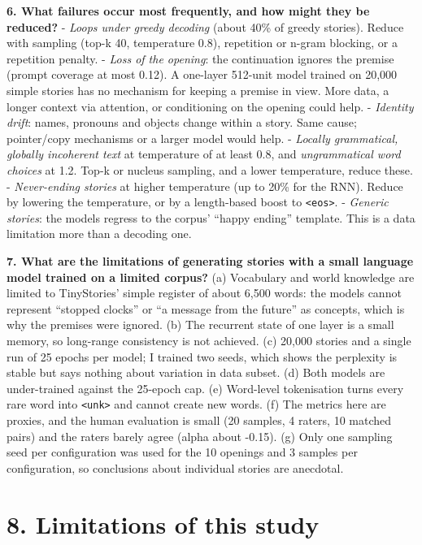 \documentclass[10pt,a4paper]{article}
\begin{document}
\textbf{6. What failures occur most frequently, and how might they be reduced?}
- \emph{Loops under greedy decoding} (about 40\% of greedy stories). Reduce with sampling (top-k 40, temperature 0.8), repetition or n-gram blocking, or a repetition penalty.
- \emph{Loss of the opening}: the continuation ignores the premise (prompt coverage at most 0.12). A one-layer 512-unit model trained on 20,000 simple stories has no mechanism
for keeping a premise in view. More data, a longer context via attention, or conditioning on the opening could help.
- \emph{Identity drift}: names, pronouns and objects change within a story. Same cause; pointer/copy mechanisms or a larger model would help.
- \emph{Locally grammatical, globally incoherent text} at temperature of at least 0.8, and \emph{ungrammatical word choices} at 1.2. Top-k or nucleus sampling, and a lower temperature, reduce these.
- \emph{Never-ending stories} at higher temperature (up to 20\% for the RNN). Reduce by lowering the temperature, or by a length-based boost to \texttt{\textless{}eos\textgreater{}}.
- \emph{Generic stories}: the models regress to the corpus' ``happy ending'' template. This is a data limitation more than a decoding one.

\textbf{7. What are the limitations of generating stories with a small language model trained on a limited corpus?} (a) Vocabulary and world knowledge are limited to TinyStories' simple
register of about 6,500 words: the models cannot represent ``stopped clocks'' or ``a message from the future'' as concepts, which is why the premises were ignored.
(b) The recurrent state of one layer is a small memory, so long-range consistency is not achieved. (c) 20,000 stories and a single run of 25 epochs per model; I trained two seeds, which shows the perplexity is stable but says nothing about
variation in data subset. (d) Both models are under-trained against the 25-epoch cap. (e) Word-level tokenisation turns every rare word into \texttt{\textless{}unk\textgreater{}} and cannot create new words. (f) The metrics here are proxies, and the
human evaluation is small (20 samples, 4 raters, 10 matched pairs) and the raters barely agree (alpha about -0.15). (g) Only one sampling seed per configuration was used for the 10 openings and 3 samples per configuration, so
conclusions about individual stories are anecdotal.

\hypertarget{limitations-of-this-study}{%
\section{8. Limitations of this study}\label{limitations-of-this-study}}
\end{document}
